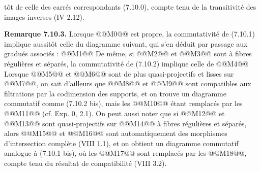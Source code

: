 
tôt de celle des carrés correspondants (7.10.0), compte tenu de la transitivité des images inverses (IV 2.12).

\textbf{Remarque 7.10.3.} Lorsque @@M0@@ est propre, la commutativité de (7.10.1) implique aussitôt celle du diagramme suivant, qui s'en déduit par passage aux gradués associés :
@@M1@@
De même, si @@M2@@ et @@M3@@ sont à fibres régulières et séparés, la commutativité de (7.10.2) implique celle de
@@M4@@
Lorsque @@M5@@ et @@M6@@ sont de plus quasi-projectifs et lisses sur @@M7@@, on sait d'ailleurs que @@M8@@ et @@M9@@ sont compatibles aux filtrations par la codimension des supports, et on trouve un diagramme commutatif comme (7.10.2 bis), mais les @@M10@@ étant remplacés par les @@M11@@ (cf. Exp. 0, 2.1). On peut aussi noter que si @@M12@@ et @@M13@@ sont quasi-projectifs sur @@M14@@ à fibres régulières et séparés, alors @@M15@@ et @@M16@@ sont automatiquement des morphismes d'intersection complète (VIII 1.1), et on obtient un diagramme commutatif analogue à (7.10.1 bis), où les @@M17@@ sont remplacés par les @@M18@@, compte tenu du résultat de compatibilité (VIII 3.2).

